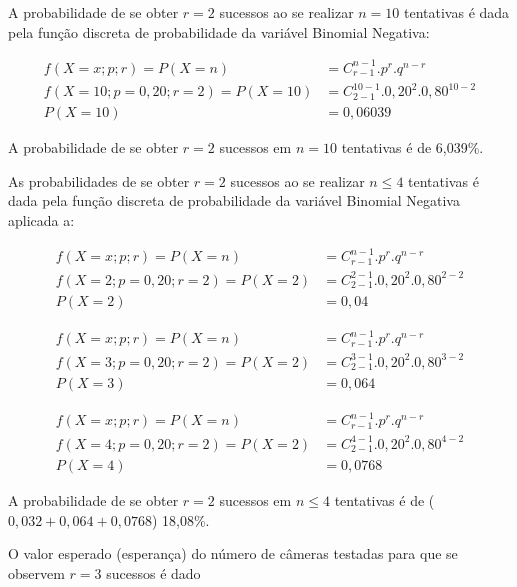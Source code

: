 \documentclass[
]{book}
\begin{document}
A probabilidade de se obter \(r=2\) sucessos ao se realizar \(n=10\) tentativas é dada pela função discreta de probabilidade da variável Binomial Negativa:

\begin{align*}
f(X=x; p; r) = P(X=n) & = {C}_{r-1}^{n-1} . {p}^{r}. {q}^{n-r} \\
f(X=10; p=0,20 ; r=2) = P(X=10) & = {C}_{2-1}^{10-1} . {0,20}^{2}. {0,80}^{10-2} \\ 
P(X=10) & = 0,06039
\end{align*}

A probabilidade de se obter \(r=2\) sucessos em \(n=10\) tentativas é de 6,039\%.

\hfill\break

As probabilidades de se obter \(r=2\) sucessos ao se realizar \(n \le 4\) tentativas é dada pela função discreta de probabilidade da variável Binomial Negativa aplicada a:

\begin{align*}
f(X=x; p; r) = P(X=n) & = {C}_{r-1}^{n-1} . {p}^{r}. {q}^{n-r} \\
f(X=2; p=0,20 ; r=2) = P(X=2)  & = {C}_{2-1}^{2-1} . {0,20}^{2}. {0,80}^{2-2} \\ 
P(X=2) & = 0,04
\end{align*}

\hfill\break

\begin{align*}
f(X=x; p; r) = P(X=n) & = {C}_{r-1}^{n-1} . {p}^{r}. {q}^{n-r} \\
f(X=3; p=0,20 ; r=2) = P(X=2) & = {C}_{2-1}^{3-1} . {0,20}^{2}. {0,80}^{3-2} \\ 
P(X=3) & = 0,064
\end{align*}

\hfill\break

\begin{align*}
f(X=x; p; r) = P(X=n) & = {C}_{r-1}^{n-1} . {p}^{r}. {q}^{n-r} \\
f(X=4; p=0,20 ; r=2) = P(X=2) & = {C}_{2-1}^{4-1} . {0,20}^{2}. {0,80}^{4-2} \\  
P(X=4) & = 0,0768
\end{align*}

A probabilidade de se obter \(r=2\) sucessos em \(n \le 4\) tentativas é de (\(0,032+0,064+0,0768\)) 18,08\%.

\hfill\break

O valor esperado (esperança) do número de câmeras testadas para que se observem \(r=3\) sucessos é dado
\end{document}

